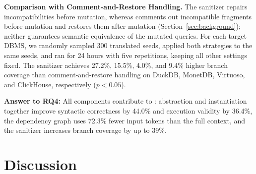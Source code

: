 \documentclass[conference]{IEEEtran}
\begin{document}
\textbf{Comparison with Comment-and-Restore Handling.}
The sanitizer repairs incompatibilities before mutation, whereas \sedar{} comments out incompatible fragments before mutation and restores them after mutation (Section~\ref{sec:background}); neither guarantees semantic equivalence of the mutated queries.
For each target DBMS, we randomly sampled 300 translated seeds, applied both strategies to the same seeds, and ran \griffin{} for 24 hours with five repetitions, keeping all other settings fixed.
The sanitizer achieves 27.2\%, 15.5\%, 4.0\%, and 9.4\% higher branch coverage than comment-and-restore handling on DuckDB, MonetDB, Virtuoso, and ClickHouse, respectively ($p<0.05$).






\raggedbottom %
\begin{answerbox}
\textbf{Answer to RQ4:} All components contribute to \tool{}: abstraction and instantiation together improve syntactic correctness by 44.0\% and execution validity by 36.4\%, the dependency graph uses 72.3\% fewer input tokens than the full context, and the sanitizer increases branch coverage by up to 39\%.
\end{answerbox}
\flushbottom





\section{Discussion}
\label{sec:discussion}
\end{document}
